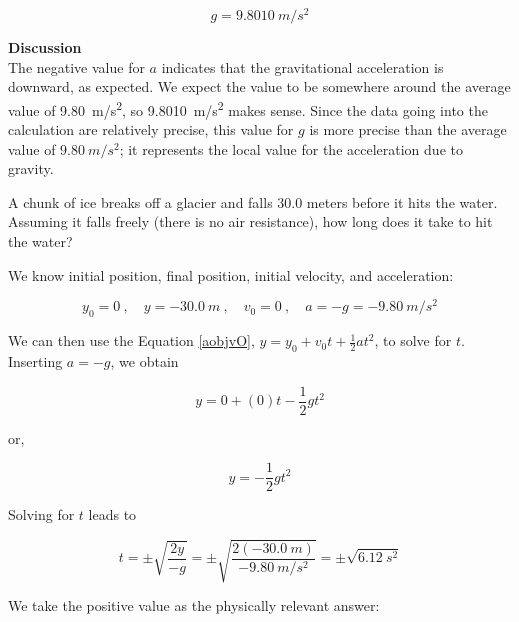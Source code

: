 \documentclass[main-ap-physics.tex]{subfiles}
\begin{document}
\begin{equation*}
    g = \SI{9.8010}{m/s^2}
\end{equation*}

\textbf{Discussion}\\
The negative value for $a$ indicates that the gravitational acceleration is downward, as expected. We expect the value to be somewhere around the average value of \SI{9.80}{m/s^2}, so \SI{9.8010}{m/s^2} makes sense. Since the data going into the calculation are relatively precise, this value for $g$ is more precise than the average value of $\SI{9.80}{m/s^2}$; it represents the local value for the acceleration due to gravity.

\vspace{1em}

\endsolution

\begin{example}
    A chunk of ice breaks off a glacier and falls 30.0 meters before it hits the water. Assuming it falls freely (there is no air resistance), how long does it take to hit the water?
\end{example}

\Solution We know initial position, final position, initial velocity, and acceleration:

\begin{equation*}
    y_0 = 0\ , \quad
    y = \SI{-30.0}{m}\ , \quad
    v_0 = 0\ , \quad
    a = -g = -\SI{9.80}{m/s^2}
\end{equation*}

We can then use the Equation \eqref{aobjvO}, $y = y_0 + v_0 t + \frac{1}{2} a t^2$, to solve for $t$. Inserting $a = -g$, we obtain

\begin{equation*}
    y = 0 + (0) t - \frac{1}{2} g t^2
\end{equation*}

or,

\begin{equation*}
    y = -\frac{1}{2} g t^2
\end{equation*}

Solving for $t$ leads to 

\begin{equation*}
    t = \pm \sqrt{\frac{2y}{-g}} = \pm \sqrt{\frac{2\left(-\SI{30.0}{m}\right)}{-\SI{9.80}{m/s^2}}} = \pm \sqrt{\SI{6.12}{s^2}}
\end{equation*}

We take the positive value as the physically relevant answer:
\end{document}
